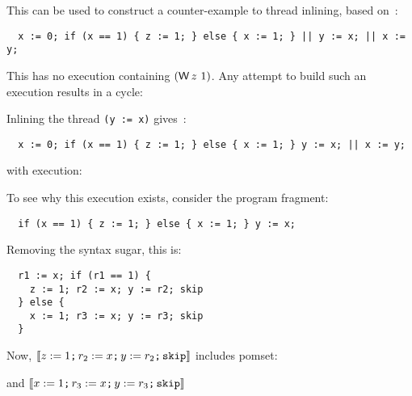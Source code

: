 This can be used to construct a counter-example to thread inlining, based on~\cite[Ex~11]{Manson:2005:JMM:1047659.1040336}:
\begin{verbatim}
  x := 0; if (x == 1) { z := 1; } else { x := 1; } || y := x; || x := y;
\end{verbatim}
This has no execution containing $(\DW z1)$. Any attempt to build such an execution
results in a cycle:
\begin{tikzdisplay}[node distance=1em]
\end{tikzdisplay}
Inlining the thread \verb|(y := x)| gives~\cite[Ex~12]{Manson:2005:JMM:1047659.1040336}:
\begin{verbatim}
  x := 0; if (x == 1) { z := 1; } else { x := 1; } y := x; || x := y;
\end{verbatim}
with execution:
\begin{tikzdisplay}[node distance=1em]
\end{tikzdisplay}
To see why this execution exists, consider the program fragment:
\begin{verbatim}
  if (x == 1) { z := 1; } else { x := 1; } y := x;
\end{verbatim}
Removing the syntax sugar, this is:
\begin{verbatim}
  r1 := x; if (r1 == 1) {
    z := 1; r2 := x; y := r2; skip
  } else {
    x := 1; r3 := x; y := r3; skip
  }
\end{verbatim}
Now, $\llbracket z := 1\texttt{;}\, r_2 := x\texttt{;}\, y := r_2\texttt{;}\, \texttt{skip}\rrbracket$
includes pomset:
\begin{tikzdisplay}[node distance=1em]
\end{tikzdisplay}
and $\llbracket x := 1\texttt{;}\, r_3 := x\texttt{;}\, y := r_3\texttt{;}\, \texttt{skip}\rrbracket$
